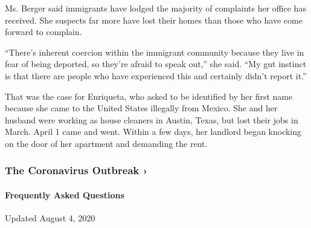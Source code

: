 Ms. Berger said immigrants have lodged the majority of complaints her
office has received. She suspects far more have lost their homes than
those who have come forward to complain.

``There's inherent coercion within the immigrant community because they
live in fear of being deported, so they're afraid to speak out,'' she
said. ``My gut instinct is that there are people who have experienced
this and certainly didn't report it.''

That was the case for Enriqueta, who asked to be identified by her first
name because she came to the United States illegally from Mexico. She
and her husband were working as house cleaners in Austin, Texas, but
lost their jobs in March. April 1 came and went. Within a few days, her
landlord began knocking on the door of her apartment and demanding the
rent.

\href{https://www.nytimes.com/news-event/coronavirus?action=click\&pgtype=Article\&state=default\&region=MAIN_CONTENT_3\&context=storylines_faq}{}

\hypertarget{the-coronavirus-outbreak-}{%
\subsubsection{The Coronavirus Outbreak
›}\label{the-coronavirus-outbreak-}}

\hypertarget{frequently-asked-questions}{%
\paragraph{Frequently Asked
Questions}\label{frequently-asked-questions}}

Updated August 4, 2020

